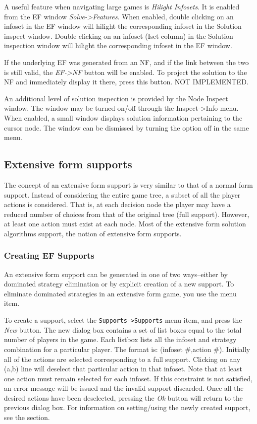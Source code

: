 A useful feature when navigating large games is {\em Hilight Infosets}.  It is enabled
from the EF window {\em Solve->Features}.  When enabled, double clicking on an
infoset in the EF window will hilight the corresponding infoset in the Solution inspect
window.  Double clicking on an infoset (Iset column) in the Solution inspection window
will hilight the corresponding infoset in the EF window.

If the underlying EF was generated from an NF, and if the link between the two is still
valid, the {\em EF->NF} button will be enabled.  To project the solution to the NF and
immediately display it there, press this button.  NOT IMPLEMENTED.
 
An additional level of solution inspection is provided by the Node Inspect
window.  The window may be turned on/off through the Inspect->Info menu. When
enabled, a small window displays solution information pertaining to the cursor
node.  The window can be dismissed by turning the option off in the same menu.

\subsection{Extensive form supports}
The concept of an extensive form support is very similar to that of a normal form support.
Instead of considering the entire game tree, a subset of all the player actions is considered.
That is, at each decision node the player may have a reduced number of choices from that of
the original tree (full support).  However, at least one action must exist at each node.  Most 
of the extensive form solution algorithms support, the notion of extensive form supports.  

\subsubsection{Creating EF Supports}
An extensive form support can be generated in one of two ways--either by 
dominated strategy elimination or by explicit creation of a new support.  
To eliminate dominated strategies in an extensive form game, you use the 
 menu item.  

To create a support, select the {\tt Supports->Supports} menu item, 
and press the {\em New} button.
The new dialog box contains a set of list boxes equal to the total number of players in the
game.  Each listbox lists all the infoset and strategy combination for a particular player.
The format is: (infoset #,action #).  Initially all of the actions are selected corresponding
to a full support.  Clicking on any (a,b) line will deselect that particular action in that
infoset.  Note that at least one action must remain selected for each infoset.  If this 
constraint is not satisfied, an error message will be issued and the invalid support discarded.
Once all the desired actions have been deselected, pressing the {\em Ok} button will return
to the previous dialog box.  For information on setting/using the newly created support, see
the  section.

